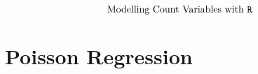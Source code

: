 \documentclass{beamer}
\begin{document}
\begin{frame}
	
	\huge
	\[ \mbox{Modelling Count Variables with \texttt{R} } \]
	\end{frame}



\section{Poisson Regression}





 
\end{document}
